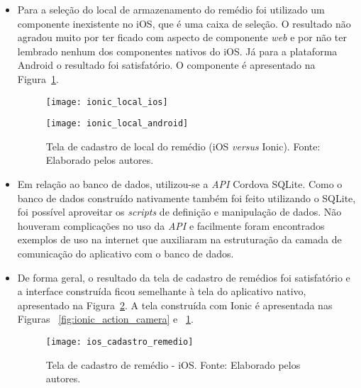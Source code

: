 \begin{itemize}
\begin{itemize}
			 	\item Para a seleção do local de armazenamento do remédio foi utilizado um componente inexistente no iOS, que é uma caixa de seleção. O resultado não agradou muito por ter ficado com aspecto de componente \textit{web} e por não ter lembrado nenhum dos componentes nativos do iOS. Já para a plataforma Android o resultado foi satisfatório. O componente é apresentado na Figura~\ref{fig:ionic_local}.
			 	
			 		 \begin{figure}[H]
			 		 	\centering
			 		 	\begin{minipage}{.5\textwidth}
			 		 		\centering
			 		 		\texttt{[image: ionic\_local\_ios]}
			 		 	\end{minipage}\hfill
			 		 	\begin{minipage}{.5\textwidth}
			 		 		\centering
			 		 		\texttt{[image: ionic\_local\_android]}
			 		 	\end{minipage}
			 		 	\caption[Tela de cadastro de local do remédio  (iOS \textit{versus} Ionic)]{ Tela de cadastro de local do remédio  (iOS \textit{versus} Ionic). Fonte: Elaborado pelos autores.}
			 		 	\label{fig:ionic_local}
			 		 \end{figure}
			 	
		 		\item Em relação ao banco de dados, utilizou-se a \textit{API} Cordova SQLite. Como o banco de dados 
		 		construído nativamente também foi feito utilizando o SQLite, foi possível aproveitar os \textit{scripts} 
		 		de definição e manipulação de dados. Não houveram complicações no uso da \textit{API} e facilmente 
		 		foram encontrados exemplos de uso na internet que auxiliaram na estruturação da camada de comunicação 
		 		do aplicativo com o banco de dados.
		 		
		 		\item De forma geral, o resultado da tela de cadastro de remédios foi satisfatório e a interface construída ficou semelhante à tela do aplicativo nativo, apresentado na Figura~\ref{fig:ios_cadastro_remedio}. A tela construída com Ionic é apresentada nas Figuras ~\ref{fig:ionic_action_camera} e ~\ref{fig:ionic_local}.
		 		
		 			 	\begin{figure}[H]
		 			 		\centering
		 			 		\texttt{[image: ios\_cadastro\_remedio]}
		 			 		\caption[Tela de cadastro de remédio - iOS]{Tela de cadastro de remédio - iOS. Fonte: Elaborado pelos autores.}
		 			 		\label{fig:ios_cadastro_remedio}
		 			 	\end{figure}
			 

\end{itemize}
\end{itemize}

